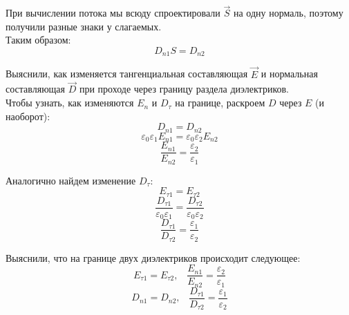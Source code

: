 \documentclass{article}
\begin{document}
	При вычислении потока мы всюду спроектировали $\vec S$ на одну нормаль, поэтому получили разные знаки у слагаемых.\\

	Таким образом:
	\begin{equation}
		D_{n1}S = D_{n2}
	\end{equation}

	Выяснили, как изменяется тангенциальная составляющая $\vec E$ и нормальная составляющая $\vec D$ при проходе через границу раздела диэлектриков.\\

	Чтобы узнать, как изменяются $E_n$ и $D_\tau$ на границе, раскроем $D$ через $E$ (и наоборот):
	\begin{equation}
		D_{n1} = D_{n2}
	\end{equation}
	\begin{equation}
		\varepsilon_0\varepsilon_1 E_{n1} = \varepsilon_0\varepsilon_2 E_{n2}
	\end{equation}
	\begin{equation}
		\frac{E_{n1}}{E_{n2}} = \frac{\varepsilon_2}{\varepsilon_1}
	\end{equation}

	Аналогично найдем изменение $D_\tau$:
	\begin{equation}
		E_{\tau1} = E_{\tau2}
	\end{equation}
	\begin{equation}
		\frac{D_{\tau1}}{\varepsilon_0\varepsilon_1} = \frac{D_{\tau2}}{\varepsilon_0\varepsilon_2}
	\end{equation}
	\begin{equation}
		\frac{D_{\tau1}}{D_{\tau2}} = \frac{\varepsilon_1}{\varepsilon_2}
	\end{equation}

	Выяснили, что на границе двух диэлектриков происходит следующее:
	\begin{equation}
		E_{\tau1} = E_{\tau2},\;\;\; \frac{E_{n1}}{E_{n2}} = \frac{\varepsilon_2}{\varepsilon_1}
	\end{equation}
	\begin{equation}
		D_{n1} = D_{n2},\;\;\; \frac{D_{\tau1}}{D_{\tau2}} = \frac{\varepsilon_1}{\varepsilon_2}
	\end{equation}
\end{document}
